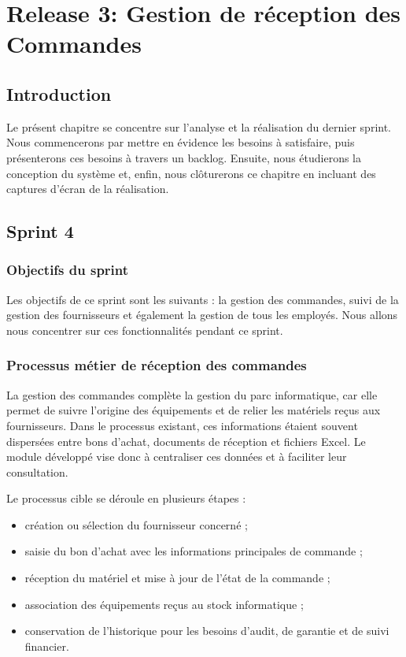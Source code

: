 ﻿\chapter{Release 3: Gestion de réception des Commandes }




\section*{Introduction}

Le présent chapitre se concentre sur l'analyse et la réalisation du dernier sprint. Nous commencerons par mettre en évidence les besoins à satisfaire, puis présenterons ces besoins à travers un backlog. Ensuite, nous étudierons la conception du système et, enfin, nous clôturerons ce chapitre en incluant des captures d'écran de la réalisation.
\section{Sprint 4}
\subsection{Objectifs du sprint }

Les objectifs de ce sprint sont les suivants : la gestion des commandes, suivi de la gestion des fournisseurs et également la gestion de tous les employés. Nous allons nous concentrer sur ces fonctionnalités pendant ce sprint.

\subsection{Processus métier de réception des commandes}

La gestion des commandes complète la gestion du parc informatique, car elle permet de suivre l'origine des équipements et de relier les matériels reçus aux fournisseurs. Dans le processus existant, ces informations étaient souvent dispersées entre bons d'achat, documents de réception et fichiers Excel. Le module développé vise donc à centraliser ces données et à faciliter leur consultation.

Le processus cible se déroule en plusieurs étapes :

\begin{itemize}[label=\textbullet,font=\normalsize]
    \item création ou sélection du fournisseur concerné ;
    \item saisie du bon d'achat avec les informations principales de commande ;
    \item réception du matériel et mise à jour de l'état de la commande ;
    \item association des équipements reçus au stock informatique ;
    \item conservation de l'historique pour les besoins d'audit, de garantie et de suivi financier.
\end{itemize}


